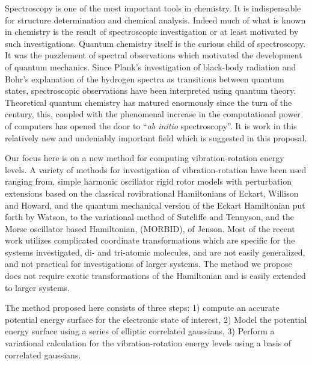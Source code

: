 \documentclass[12pt,thmsa]{article}
\begin{document}
\hspace{1.0in}

\vspace{1.0in}

Spectroscopy is one of the most important tools in chemistry. It is
indispensable for structure determination and chemical analysis. Indeed much
of what is known in chemistry is the result of spectroscopic investigation
or at least motivated by such investigations. Quantum chemistry itself is
the curious child of spectroscopy. It was the puzzlement of spectral
observations which motivated the development of quantum mechanics. Since
Plank's investigation of black-body radiation and Bohr's explanation of the
hydrogen spectra as transitions between quantum states, spectroscopic
observations have been interpreted using quantum theory. Theoretical quantum
chemistry has matured enormously since the turn of the century, this,
coupled with the phenomenal increase in the computational power of computers
has opened the door to ``\emph{ab initio} spectroscopy''. It is work in this
relatively new and undeniably important field which is suggested in this
proposal.

Our focus here is on a new method for computing vibration-rotation energy
levels. A variety of methods for investigation of vibration-rotation have
been used ranging from, simple harmonic oscillator rigid rotor models with
perturbation extensions based on the classical rovibrational Hamiltonians of
Eckart\cite{Eckart35}, Willison and Howard\cite{WilsonHoward36}, and the
quantum mechanical version of the Eckart Hamiltonian put forth by Watson\cite
{Watson68}, to the variational method of Sutcliffe and Tennyson\cite
{SutcliffeTennyson87}, and the Morse oscillator based Hamiltonian, (MORBID),
of Jenson\cite{Jenson88}. Most of the recent work utilizes complicated
coordinate transformations which are specific for the systems investigated,
di- and tri-atomic molecules, and are not easily generalized, and not
practical for investigations of larger systems. The method we propose does
not require exotic transformations of the Hamiltonian and is easily extended
to larger systems.

The method proposed here consists of three steps: 1) compute an accurate
potential energy surface for the electronic state of interest, 2) Model the
potential energy surface using a series of elliptic correlated gaussians, 3)
Perform a variational calculation for the vibration-rotation energy levels
using a basis of correlated gaussians.
\end{document}
